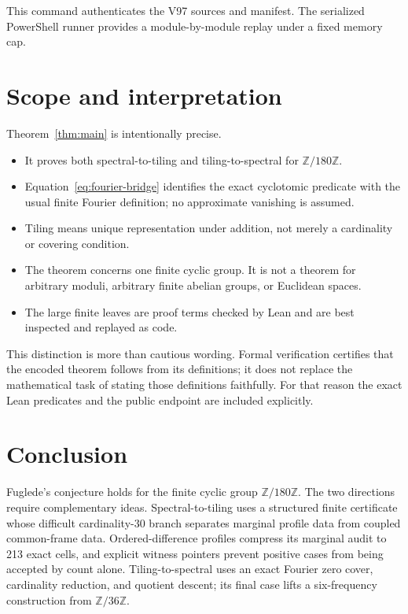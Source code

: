 \documentclass[10pt,twocolumn]{article}
\theoremstyle{definition}
\theoremstyle{remark}
\newcommand{\Z}{\mathbb Z}
\newcommand{\Zmod}[1]{\Z/#1\Z}
\begin{document}
This command authenticates the V97 sources and manifest.  The serialized
PowerShell runner provides a module-by-module replay under a fixed memory cap.

\section{Scope and interpretation}

Theorem~\ref{thm:main} is intentionally precise.

\begin{itemize}
  \item It proves both spectral-to-tiling and tiling-to-spectral for
    $\Zmod{180}$.
  \item Equation~\eqref{eq:fourier-bridge} identifies the exact cyclotomic
    predicate with the usual finite Fourier definition; no approximate
    vanishing is assumed.
  \item Tiling means unique representation under addition, not merely a
    cardinality or covering condition.
  \item The theorem concerns one finite cyclic group.  It is not a theorem for
    arbitrary moduli, arbitrary finite abelian groups, or Euclidean spaces.
  \item The large finite leaves are proof terms checked by Lean and are best
    inspected and replayed as code.
\end{itemize}

This distinction is more than cautious wording.  Formal verification certifies
that the encoded theorem follows from its definitions; it does not replace the
mathematical task of stating those definitions faithfully.  For that reason
the exact Lean predicates and the public endpoint are included explicitly.

\section{Conclusion}

Fuglede's conjecture holds for the finite cyclic group $\Zmod{180}$.  The two
directions require complementary ideas.  Spectral-to-tiling uses a structured
finite certificate whose difficult cardinality-$30$ branch separates marginal
profile data from coupled common-frame data.  Ordered-difference profiles
compress its marginal audit to 213 exact cells, and explicit witness pointers
prevent positive cases from being accepted by count alone.  Tiling-to-spectral
uses an exact Fourier zero cover, cardinality reduction, and quotient descent;
its final case lifts a six-frequency construction from $\Zmod{36}$.
\end{document}
